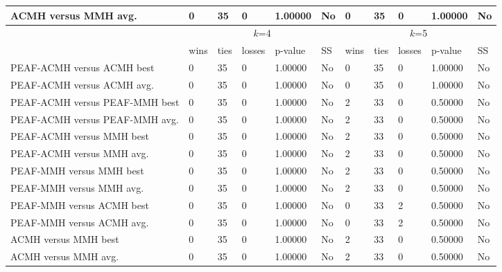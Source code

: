 \documentclass[12pt, a4paper]{article}%
\numberwithin{equation}{section}
\theoremstyle{plain}
\begin{document}
{\begin{landscape}
\begin{longtable}{|l|lllll|lllll|}
						ACMH versus MMH avg.                   & 0    & 35   & 0      & 1.00000 & No & 0    & 35   & 0      & 1.00000 & No \\ \hline
						\multicolumn{1}{|c|}{\multirow{2}{*}{}} & \multicolumn{5}{c|}{$k$=4}          & \multicolumn{5}{c|}{$k$=5}          \\ \cline{2-11} 
						\multicolumn{1}{|c|}{}                  & wins & ties & losses & p-value & SS & wins & ties & losses & p-value & SS \\ \hline
						PEAF-ACMH versus ACMH best             & 0    & 35   & 0      & 1.00000 & No & 0    & 35   & 0      & 1.00000 & No \\
						PEAF-ACMH versus ACMH avg.             & 0    & 35   & 0      & 1.00000 & No & 0    & 35   & 0      & 1.00000 & No \\
						PEAF-ACMH versus PEAF-MMH best           & 0    & 35   & 0      & 1.00000 & No & 2    & 33   & 0      & 0.50000 & No \\
						PEAF-ACMH versus PEAF-MMH avg.           & 0    & 35   & 0      & 1.00000 & No & 2    & 33   & 0      & 0.50000 & No \\
						PEAF-ACMH versus MMH best               & 0    & 35   & 0      & 1.00000 & No & 2    & 33   & 0      & 0.50000 & No \\
						PEAF-ACMH versus MMH avg.               & 0    & 35   & 0      & 1.00000 & No & 2    & 33   & 0      & 0.50000 & No \\
						PEAF-MMH versus MMH best                 & 0    & 35   & 0      & 1.00000 & No & 2    & 33   & 0      & 0.50000 & No \\
						PEAF-MMH versus MMH avg.                 & 0    & 35   & 0      & 1.00000 & No & 2    & 33   & 0      & 0.50000 & No \\
						PEAF-MMH versus ACMH best               & 0    & 35   & 0      & 1.00000 & No & 0    & 33   & 2      & 0.50000 & No \\
						PEAF-MMH versus ACMH avg.               & 0    & 35   & 0      & 1.00000 & No & 0    & 33   & 2      & 0.50000 & No \\
						ACMH versus MMH best                   & 0    & 35   & 0      & 1.00000 & No & 2    & 33   & 0      & 0.50000 & No \\
						ACMH versus MMH avg.                   & 0    & 35   & 0      & 1.00000 & No & 2    & 33   & 0      & 0.50000 & No \\ \hline
					\end{longtable}
				\end{landscape}
			}
			
\end{document}
